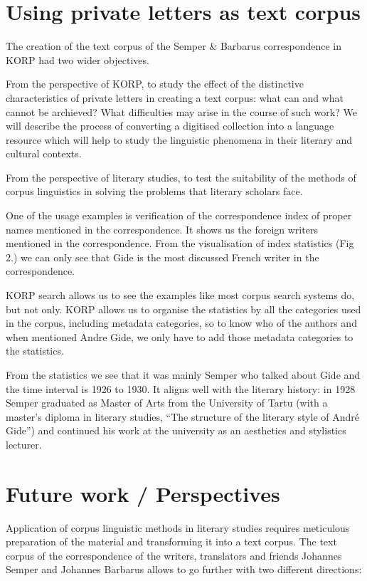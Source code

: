 \documentclass[runningheads]{llncs}
\begin{document}
\section{Using private letters as text corpus}

The creation of the text corpus of the Semper \& Barbarus correspondence in KORP had two wider objectives.  

From the perspective of KORP, to study the effect of the distinctive characteristics of private letters in creating a text corpus: what can and what cannot be archieved? What difficulties may arise in the course of such work? We will describe the process of converting a digitised collection into a language resource which will help to study the linguistic phenomena in their literary and cultural contexts.

From the perspective of literary studies, to test the suitability of the methods of corpus linguistics in solving the problems that literary scholars face.

One of the usage examples is verification of the correspondence index of proper names mentioned in the correspondence. It shows us the foreign writers mentioned in the correspondence. From the visualisation of index statistics (Fig 2.) we can only see that Gide is the most discussed French writer in the correspondence.  

KORP search allows us to see the examples like most corpus search systems do, but not only. KORP allows us to organise the statistics by all the categories used in the corpus, including metadata categories, so to know who of the authors and when mentioned Andre Gide, we only have to add those metadata categories to the statistics. 

From the statistics we see that it was mainly Semper who talked about Gide and the time interval is 1926 to 1930. It aligns well with the literary history: in 1928 Semper graduated as Master of Arts from the University of Tartu (with a master’s diploma in literary studies, “The structure of the literary style of André Gide”) and continued his work at the university as an aesthetics and stylistics lecturer. 

\section{Future work / Perspectives}

Application of corpus linguistic methods in literary studies requires meticulous preparation of the material and transforming it into a text corpus. The text corpus of the correspondence of the writers, translators and friends Johannes Semper and Johannes Barbarus allows to go further with two different directions:
\end{document}
